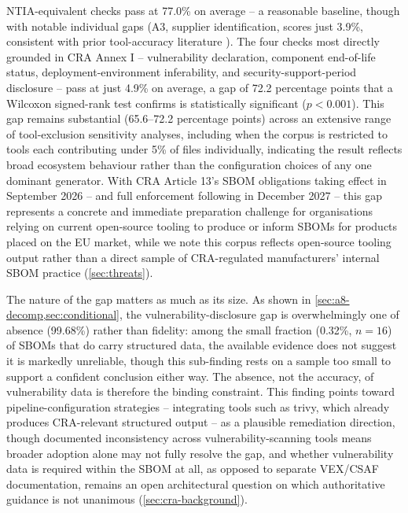 \documentclass[11pt]{article}
\begin{document}
NTIA-equivalent checks pass at 77.0\% on average -- a reasonable baseline, though with notable individual gaps (A3, supplier identification, scores just 3.9\%, consistent with prior tool-accuracy literature \cite{muneza2025,halbritter2024}). The four checks most directly grounded in CRA Annex I -- vulnerability declaration, component end-of-life status, deployment-environment inferability, and security-support-period disclosure -- pass at just 4.9\% on average, a gap of 72.2 percentage points that a Wilcoxon signed-rank test confirms is statistically significant ($p<0.001$). This gap remains substantial (65.6--72.2 percentage points) across an extensive range of tool-exclusion sensitivity analyses, including when the corpus is restricted to tools each contributing under 5\% of files individually, indicating the result reflects broad ecosystem behaviour rather than the configuration choices of any one dominant generator. With CRA Article 13's SBOM obligations taking effect in September 2026 -- and full enforcement following in December 2027 -- this gap represents a concrete and immediate preparation challenge for organisations relying on current open-source tooling to produce or inform SBOMs for products placed on the EU market, while we note this corpus reflects open-source tooling output rather than a direct sample of CRA-regulated manufacturers' internal SBOM practice (\cref{sec:threats}).

The nature of the gap matters as much as its size. As shown in \cref{sec:a8-decomp,sec:conditional}, the vulnerability-disclosure gap is overwhelmingly one of absence (99.68\%) rather than fidelity: among the small fraction (0.32\%, $n=16$) of SBOMs that do carry structured data, the available evidence does not suggest it is markedly unreliable, though this sub-finding rests on a sample too small to support a confident conclusion either way. The absence, not the accuracy, of vulnerability data is therefore the binding constraint. This finding points toward pipeline-configuration strategies -- integrating tools such as trivy, which already produces CRA-relevant structured output -- as a plausible remediation direction, though documented inconsistency across vulnerability-scanning tools \cite{churakova2025} means broader adoption alone may not fully resolve the gap, and whether vulnerability data is required within the SBOM at all, as opposed to separate VEX/CSAF documentation, remains an open architectural question on which authoritative guidance is not unanimous (\cref{sec:cra-background}).
\end{document}
